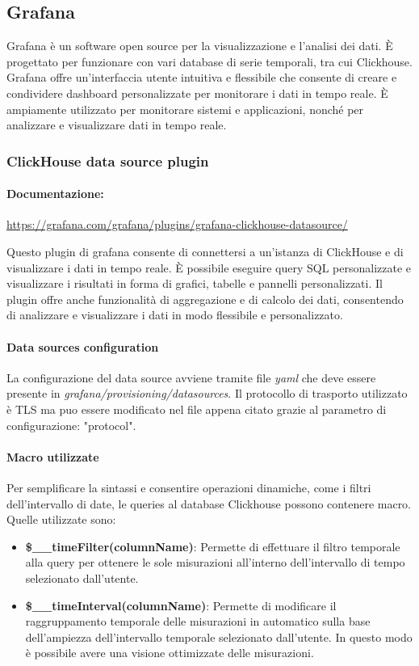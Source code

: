 \subsection{Grafana}
Grafana è un software open source per la visualizzazione e l'analisi dei dati. È progettato per funzionare con vari database di serie temporali, tra cui Clickhouse. Grafana offre un'interfaccia utente intuitiva e flessibile che consente di creare e condividere dashboard personalizzate per monitorare i dati in tempo reale. È ampiamente utilizzato per monitorare sistemi e applicazioni, nonché per analizzare e visualizzare dati in tempo reale.

\subsubsection{ClickHouse data source plugin} \label{sec:click_plugin}
\paragraph{Documentazione:} \href{https://grafana.com/grafana/plugins/grafana-clickhouse-datasource/}{https://grafana.com/grafana/plugins/grafana-clickhouse-datasource/}

Questo plugin di grafana consente di connettersi a un'istanza di ClickHouse e di visualizzare i dati in tempo reale. È possibile eseguire query SQL personalizzate e visualizzare i risultati in forma di grafici, tabelle e pannelli personalizzati. Il plugin offre anche funzionalità di aggregazione e di calcolo dei dati, consentendo di analizzare e visualizzare i dati in modo flessibile e personalizzato.

\paragraph{Data sources configuration}
La configurazione del data source avviene tramite file \textit{yaml} che deve essere presente in \textit{grafana/provisioning/datasources}.
Il protocollo di trasporto utilizzato è TLS ma puo essere modificato nel file appena citato grazie al parametro di configurazione: "protocol".

\paragraph{Macro utilizzate}
Per semplificare la sintassi e consentire operazioni dinamiche, come i filtri dell'intervallo di date, le queries al database Clickhouse possono contenere macro.
Quelle utilizzate sono:
\begin{itemize}
    \item \textbf{\$\_\_timeFilter(columnName)}: Permette di effettuare il filtro temporale alla query per ottenere le sole misurazioni all'interno dell'intervallo di tempo selezionato dall'utente.
    \item  \textbf{\$\_\_timeInterval(columnName)}: Permette di modificare il raggruppamento temporale delle misurazioni in automatico sulla base dell'ampiezza dell'intervallo temporale selezionato dall'utente.
    In questo modo è possibile avere una visione ottimizzate delle misurazioni.
\end{itemize}

